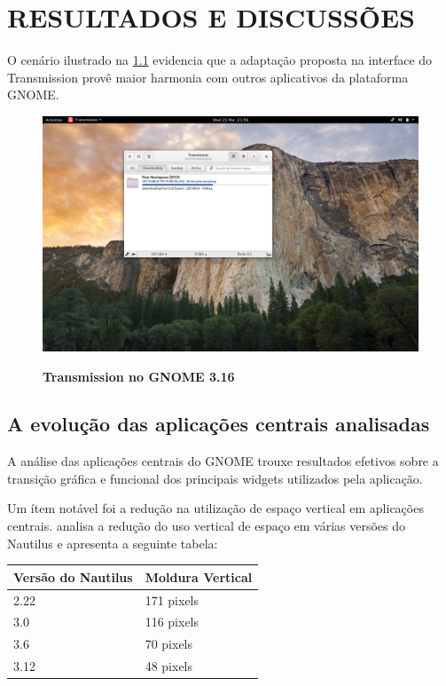\chapter{RESULTADOS E DISCUSSÕES}

O cenário ilustrado na \ref{transmission-at-gnome} evidencia que a adaptação
proposta na interface do Transmission provê maior harmonia com outros
aplicativos da plataforma GNOME.

\begin{figure}[htb]
  \begin{center}
    \caption{\textbf{Transmission no GNOME 3.16}}\label{transmission-at-gnome}
    \includegraphics [scale=0.2]{image/transmission-gtk3-main.png}
    \label{transmission-at-gnome}
  \end{center}
\end{figure}

\section{A evolução das aplicações centrais analisadas}

A análise das aplicações centrais do GNOME trouxe resultados efetivos sobre a
transição gráfica e funcional dos principais widgets utilizados pela aplicação.

Um ítem notável foi a redução na utilização de espaço vertical em aplicações
centrais.  analisa a redução do uso vertical de espaço
em várias versões do Nautilus e apresenta a seguinte tabela:

\begin{center}
    \begin{tabular}{ | l | l | } 
    \hline
    Versão do Nautilus & Moldura Vertical \\ \hline
    2.22 & 171 pixels \\
    3.0  & 116 pixels \\
    3.6  & 70 pixels \\
    3.12 & 48 pixels \\
    \hline
    \end{tabular}
\end{center}

